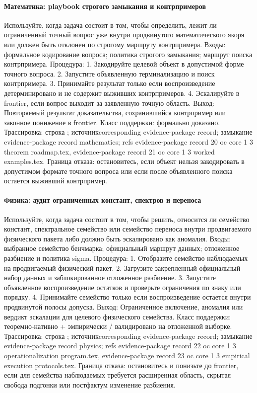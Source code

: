 \paragraph{Математика: playbook строгого замыкания и контрпримеров}
Используйте, когда задача состоит в том, чтобы определить, лежит ли ограниченный точный вопрос уже внутри продвинутого математического якоря или должен быть отклонен по строгому маршруту контрпримера.
Входы: формальное кодирование вопроса; \allowbreak политика строгого замыкания; \allowbreak маршрут поиска контрпримера.
Процедура: 1. Закодируйте целевой объект в допустимой форме точного вопроса. 2. Запустите объявленную терминализацию и поиск контрпримера. 3. Принимайте результат только если воспроизведение детерминировано и не содержит выживших контрпримеров. 4. Эскалируйте в frontier, если вопрос выходит за заявленную точную область.
Выход: Повторяемый результат доказательства, сохранившийся контрпример или законное понижение в frontier.
Класс поддержки: формально доказано.
Трассировка: строка ; \allowbreak источникcorresponding evidence-package record; \allowbreak замыкание evidence-package record mathematics; \allowbreak refs evidence-package record 20 oc core 1 3 theorem roadmap.tex, \allowbreak evidence-package record 21 oc core 1 3 worked examples.tex.
Граница отказа: остановитесь, если объект нельзя закодировать в допустимом формате точного вопроса или если после объявленного поиска остается выживший контрпример.

\paragraph{Физика: аудит ограниченных констант, спектров и переноса}
Используйте, когда задача состоит в том, чтобы решить, относится ли семейство констант, спектральное семейство или семейство переноса внутри продвигаемого физического пакета либо должно быть эскалировано как аномалия.
Входы: выбранное семейство бенчмарка; \allowbreak официальный маршрут данных; \allowbreak отложенное разбиение и политика sigma.
Процедура: 1. Отобразите семейство наблюдаемых на продвигаемый физический пакет. 2. Загрузите закрепленный официальный набор данных и заблокированное отложенное разбиение. 3. Запустите объявленное воспроизведение остатков и проверьте ограничения по знаку или порядку. 4. Принимайте семейство только если воспроизведение остается внутри продвинутой полосы допуска.
Выход: Ограниченное включение, аномалия или вердикт эскалации для целевого физического семейства.
Класс поддержки: теоремно-нативно + эмпирически / валидировано на отложенной выборке.
Трассировка: строка ; \allowbreak источникcorresponding evidence-package record; \allowbreak замыкание evidence-package record physics; \allowbreak refs evidence-package record 22 oc core 1 3 operationalization program.tex, \allowbreak evidence-package record 23 oc core 1 3 empirical execution protocols.tex.
Граница отказа: остановитесь и понизьте до frontier, если для семейства наблюдаемых требуется расширенная область, скрытая свобода подгонки или постфактум изменение разбиения.

